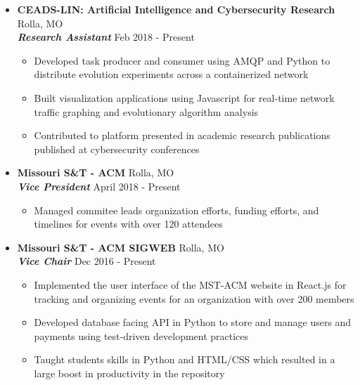 \documentclass[9pt,oneside]{memoir}
\begin{document}
\begin{itemize}
    \item[] \textbf{CEADS-LIN: Artificial Intelligence and Cybersecurity Research}
    \hfill Rolla, MO\\
    \textit{\textbf{Research Assistant}}
    \hfill Feb 2018 - Present
    \begin{itemize}
      \item[\textbullet] Developed task producer and consumer using AMQP and Python to distribute evolution experiments across a containerized network
      \item[\textbullet] Built visualization applications using Javascript for real-time network traffic graphing and evolutionary algorithm analysis
      \item[\textbullet] Contributed to platform presented in academic research publications published at cybersecurity conferences
    \end{itemize}

  \item[] \textbf{Missouri S\&T - ACM}
      \hfill Rolla, MO\\
      \textit{\textbf{Vice President}}
      \hfill April 2018 - Present
      \begin{itemize}
          \item[\textbullet] Managed commitee leads organization efforts, funding efforts, and timelines for events with over 120 attendees
      \end{itemize}
    
  \item[] \textbf{Missouri S\&T - ACM SIGWEB}
    \hfill Rolla, MO\\
    \textit{\textbf{Vice Chair}}
    \hfill Dec 2016 - Present
    \begin{itemize}
      \item[\textbullet] Implemented the user interface of the MST-ACM website in React.js for tracking and organizing events for an organization with over 200 members
      \item[\textbullet] Developed database facing API in Python to store and manage users and payments using test-driven development practices
      \item[\textbullet] Taught students skills in Python and HTML/CSS which resulted in a large boost in productivity in the repository
    \end{itemize}
\end{itemize}
\end{document}
